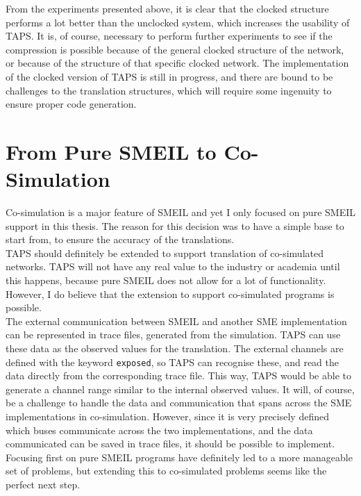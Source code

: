 From the experiments presented above, it is clear that the clocked structure performs a lot better than the unclocked system, which increases the usability of TAPS. It is, of course, necessary to perform further experiments to see if the compression is possible because of the general clocked structure of the network, or because of the structure of that specific clocked network.
The implementation of the clocked version of TAPS is still in progress, and there are bound to be challenges to the translation structures, which will require some ingenuity to ensure proper code generation.
\section{From Pure SMEIL to Co-Simulation}
Co-simulation is a major feature of SMEIL and yet I only focused on pure SMEIL support in this thesis. The reason for this decision was to have a simple base to start from, to ensure the accuracy of the translations.\\

TAPS should definitely be extended to support translation of co-simulated networks. TAPS will not have any real value to the industry or academia until this happens, because pure SMEIL does not allow for a lot of functionality.
However, I do believe that the extension to support co-simulated programs is possible.\\

The external communication between SMEIL and another SME implementation can be represented in trace files, generated from the simulation. TAPS can use these data as the observed values for the translation. The external channels are defined with the keyword \texttt{exposed}, so TAPS can recognise these, and read the data directly from the corresponding trace file. This way, TAPS would be able to generate a channel range similar to the internal observed values.
It will, of course, be a challenge to handle the data and communication that spans across the SME implementations in co-simulation. However, since it is very precisely defined which buses communicate across the two implementations, and the data communicated can be saved in trace files, it should be possible to implement.\\

Focusing first on pure SMEIL programs have definitely led to a more manageable set of problems, but extending this to co-simulated problems seems like the perfect next step.

